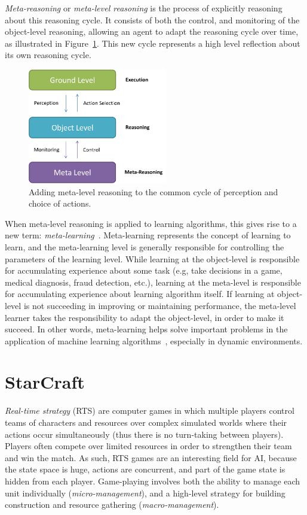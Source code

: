 \textit{Meta-reasoning} or \textit{meta-level reasoning} is the process of explicitly reasoning about this reasoning cycle. 
It consists of both the control, and monitoring of the object-level reasoning, allowing an agent to adapt the reasoning cycle over time, as illustrated in Figure~\ref{fig:metareasoning}. 
This new cycle represents a high level reflection about its own reasoning cycle. 

\begin{figure}[ht]
\centering
\includegraphics[width=230px]{images/metareasoning}
\caption{Adding meta-level reasoning to the common cycle of perception and choice of actions.}
\label{fig:metareasoning}
\end{figure}

When meta-level reasoning is applied to learning algorithms, this gives rise to a new term: \textit{meta-learning}~\cite{schweighofer2003meta, doya2002metalearning}.
Meta-learning represents the concept of learning to learn, and the meta-learning level is generally responsible for controlling the parameters of the learning level.
While learning at the object-level is responsible for accumulating experience about some task (e.g, take decisions in a game, medical diagnosis, fraud detection, etc.), learning at the meta-level is responsible for accumulating experience about learning algorithm itself. 
If learning at object-level is not succeeding in improving or maintaining performance, the meta-level learner takes the responsibility to adapt the object-level, in order to make it succeed.
In other words, meta-learning helps solve important problems in the application of machine learning algorithms~\cite{vilalta2004using}, especially in dynamic environments.



\section{StarCraft}
\label{sec:sc}

\emph{Real-time strategy} (RTS) are computer games in which multiple players control teams of characters and resources over complex simulated worlds where their actions occur simultaneously (thus there is no turn-taking between players). 
Players often compete over limited resources in order to strengthen their team and win the match. 
As such, RTS games are an interesting field for AI, because the state space is huge, actions are concurrent, and part of the game state is hidden from each player. 
Game-playing involves both the ability to manage each unit individually (\textit{micro-management}), and a high-level strategy for building construction and resource gathering (\textit{macro-management}). 

